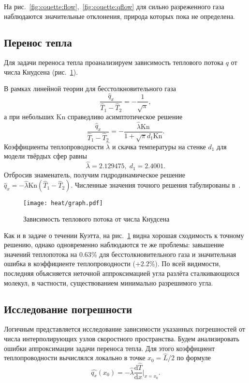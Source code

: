 \documentclass[a4paper,12pt]{article}
\newcommand{\Kn}{\mathrm{Kn}}
\newcommand{\dd}{\mathrm{d}}
\begin{document}
На рис.~\ref{fig:couette:flow},~\ref{fig:couette:qflow} для сильно разреженного газа наблюдаются
значительные отклонения, природа которых пока не определена.

\subsection{Перенос тепла}

Для задачи переноса тепла проанализируем зависимость теплового потока \(q\) от числа Кнудсена (рис.~\ref{fig:heat}).

В рамках линейной теории для бесстолкновительного газа
\[ \frac{\hat{q}_x}{\hat{T}_1-\hat{T}_2} = -\frac1{\sqrt{\pi}}, \]
а при небольших \(\Kn\) справедливо асимптотическое решение
\[ \frac{\hat{q}_x}{\hat{T}_1-\hat{T}_2} = -\frac{\hat{\lambda}\Kn}{1+\sqrt{\pi}d_1\Kn}. \]
Коэффициенты теплопроводности \(\hat{\lambda}\) и скачка температуры на стенке \(d_1\) для модели твёрдых сфер равны~\cite{Sone2007}
\[ \hat{\lambda} = 2.129475, \; d_1 = 2.4001. \]
Отбросив знаменатель, получим гидродинамическое решение \(\hat{q}_x = -\hat{\lambda}\Kn(\hat{T}_1-\hat{T}_2)\).
Численные значения точного решения табулированы в~\cite{Sone2007}.

\begin{figure}
    \centering
    \texttt{[image: heat/graph.pdf]}
    \caption{Зависимость теплового потока от числа Кнудсена}\label{fig:heat}
\end{figure}

Как и в задаче о течении Куэтта, на рис.~\ref{fig:heat} видна хорошая сходимость к точному решению,
однако одновременно наблюдаются те же проблемы: завышение значений теплопотока на \(0.63\)\%
для бесстолкновительного газа и значительная ошибка в коэффициенте теплопроводности (\(+2.2\%\)).
По всей видимости, последняя объясняется неточной аппроксимацией угла разлёта сталкивающихся молекул,
в частности, существованием минимально разрешимого угла.

\subsection{Исследование погрешности}

Логичным представляется исследование зависимости указанных погрешностей от числа интерполирующих узлов
скоростного пространства. Будем анализировать ошибки аппроксимации задачи переноса тепла.
Для этого коэффициент теплопроводности вычислялся локально в точке \(x_0=\hat L/2\) по формуле
\[ \hat{q_x}(x_0) = -\hat{\lambda}\frac{\dd\hat T}{\dd x}\bigg|_{x=x_0}. \]
\end{document}
